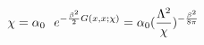 \begin{equation}
\chi = \alpha_0
~~e^{- {\beta^2 \over 2} G(x,x;\chi)} = \alpha_0
(\frac{\Lambda^2}{\chi})^{-\frac{\beta^2}{8\pi}}
\end{equation}

